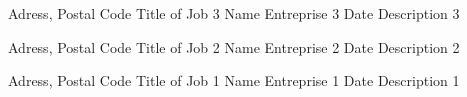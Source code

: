 \begin{cventries}
	
    \cventry
    {\textnormal{Adress, Postal Code}}
    {Title of Job 3}
    {Name Entreprise 3}
    {Date}
    {Description 3}
    \vspace{8 mm}    

   
   \cventry
    {\textnormal{Adress, Postal Code}}
    {Title of Job 2}
    {Name Entreprise 2}
    {Date}
    {Description 2}
    \vspace{8 mm}    
    
    
    \cventry
    {\textnormal{Adress, Postal Code}}
    {Title of Job 1}
    {Name Entreprise 1}
    {Date}
    {Description 1}
    \vspace{1 cm}    
    
\end{cventries}

